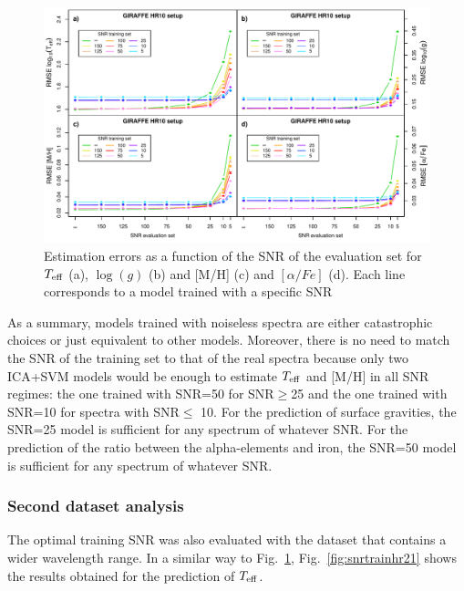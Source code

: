 \documentclass[a4paper,fleqn,usenatbib]{mnras}
\begin{document}
{{{\begin{figure}
\centering\includegraphics[width=\textwidth]{snr_errors_log_global_2x2.pdf}
\caption{Estimation errors as a function of the SNR of the evaluation
  set for $T_{\rm eff}$ (a), $\log(g)$ (b) and [M/H] (c) and
  $\left[ \alpha/Fe \right]$ (d). Each line corresponds to a model 
  trained with a specific SNR}
\label{fig:snrtrain}
\end{figure}

As a summary, models trained with noiseless spectra are either 
catastrophic choices or just equivalent to other models. Moreover, 
there is no need to match the SNR of the training set to that of the 
real spectra because only two ICA+SVM models would be enough to 
estimate $T_{\rm eff}$ and [M/H] in all SNR regimes: the one trained 
with SNR=50 for SNR$\ge$25 and the one trained with SNR=10 for spectra 
with SNR$\le$ 10. For the prediction of surface gravities, the SNR=25 model 
is sufficient for any spectrum of whatever SNR. For the prediction of 
the ratio between the alpha-elements and iron, the SNR=50 model is 
sufficient for any spectrum of whatever SNR.


\subsubsection{Second dataset analysis}
The optimal training SNR was also evaluated with the dataset that 
contains a wider wavelength range. In a similar way to 
Fig.~\ref{fig:snrtrain}, Fig.~\ref{fig:snrtrainhr21} 
shows the results obtained for the prediction of $T_{\rm eff}$.

}}}
\end{document}

